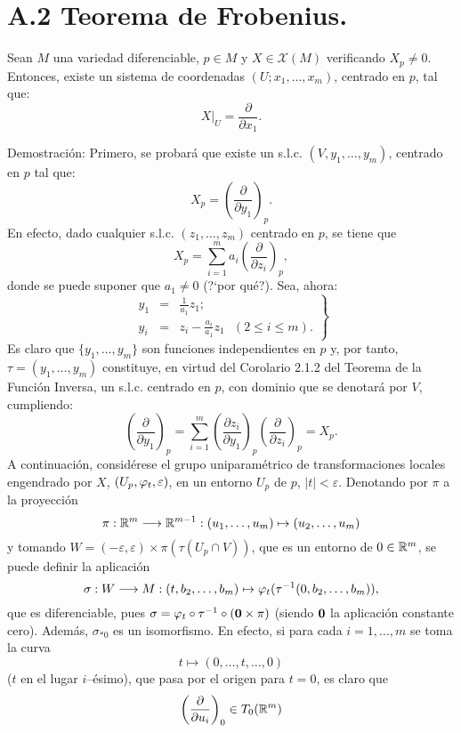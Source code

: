 \documentclass[cursovd_portada.tex]{subfiles}
\begin{document}
\section*{A.2 Teorema de Frobenius.}
\begin{lemaap} Sean $M$ una variedad diferenciable, $p\in M$ y $X\in\mathcal{X}(M)$ verificando $X_p\neq 0$. Entonces,
existe un sistema de coordenadas $(U;x_1,\dots ,x_m)$, centrado en $p$, tal que:
$$X|_U=\frac{\partial}{\partial x_1}.$$
\end{lemaap}
{\sc Demostración:} Primero, se probará que existe un s.l.c. $(V,y_1,\dots , y_m)$, centrado en $p$ tal que:
$$X_p=\left(\frac{\partial}{\partial y_1}\right)_p.$$
\hs En efecto, dado cualquier s.l.c. $(z_1,\dots ,z_m)$ centrado en $p$, se tiene que
$$X_p=\sum_{i=1}^ma_i(\frac{\partial}{\partial z_i})_p,$$
donde se puede suponer que $a_1\neq 0$ (?`por qué?). Sea, ahora:
$$\left .
\begin{array}{lll}
y_1 & = & \displaystyle{\frac{1}{a_1}}z_1;\\
y_i & = & z_i-\displaystyle{\frac{a_i}{a_1}}z_1\mbox{ }(2\leq i\leq m).
\end{array}
\right \}
$$
\hs Es claro que $\{y_1,\dots ,y_m\}$ son funciones independientes en $p$ y, por tanto, $\tau=(y_1,\dots ,y_m)$
constituye, en virtud del Corolario 2.1.2 del Teorema de la Función Inversa, un s.l.c. centrado en $p$, con
dominio que se denotará por $V$, cum\-plien\-do:
$$\left(\frac{\partial}{\partial y_1}\right)_p=\sum_{i=1}^m(\frac{\partial z_i}{\partial
y_1})_p(\frac{\partial}{\partial z_i})_p=X_p.$$ \hs A continuación, considérese el grupo uniparamétrico de
transformaciones locales engendrado por $X$, $(U_p,\varphi_t,\varepsilon)$, en un entorno $U_p$ de $p$, $\vert t\vert
<\varepsilon$. Denotando por $\pi$ a la proyección
$$\pi:\mathbb{R}^m\longrightarrow\mathbb{R}^{m-1}:(u_1,\dots ,u_m)\mapsto (u_2,\dots ,u_m)$$
y tomando $W=(-\varepsilon,\varepsilon)\times\pi(\tau(U_p\cap V))$, que es un entorno de $0\in\mathbb{R}^m$, se puede definir la
aplicación
$$\sigma:W\longrightarrow M:(t,b_2,\dots ,b_m)\mapsto\varphi_t(\tau^{-1}(0,b_2,\dots ,b_m)),$$
que es diferenciable, pues $\sigma=\varphi_t\circ\tau^{-1}\circ({\bf 0}\times\pi)$ (siendo ${\bf 0}$ la aplicación
constante cero). Además, $\sigma_{*0}$ es un isomorfismo. En efecto, si para cada $i=1,\dots ,m$ se toma la curva
$$t\mapsto (0,\dots ,t,\dots ,0)$$
($t$ en el lugar $i$--ésimo), que pasa por el origen para $t=0$, es claro que
$$\left(\frac{\partial}{\partial u_i}\right)_0\in T_0(\mathbb{R}^m)$$
\end{document}
